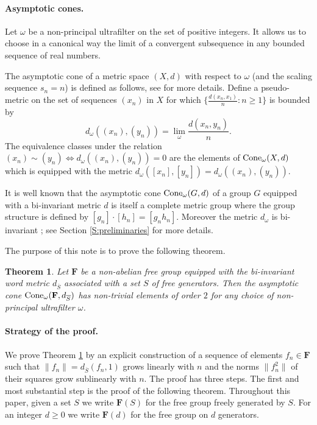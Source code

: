 \documentclass[12pt,reqno,a4paper]{article}
\newtheorem{theorem}{Theorem}[section]
\theoremstyle{definition}
\theoremstyle{remark}
\numberwithin{equation}{section}
\numberwithin{figure}{section}
\newcommand{\B}[1]{{\mathbf #1}}
\begin{document}


\paragraph{Asymptotic cones.}
Let $\omega$ be a non-principal ultrafilter on the set of positive integers.
It allows us to choose in a canonical way the limit of a convergent subsequence in any bounded sequence of real numbers.

The asymptotic cone of a metric space $(X,d)$ with respect to $\omega$ (and the scaling sequence $s_n=n$) is defined as follows, see \cite{zbMATH06866242} for more details.
Define a pseudo-metric on the set of sequences $(x_n)$ in $X$ for which $\{\tfrac{d(x_n,x_1)}{n}: n \geq 1 \}$ is bounded by 
\[
d_\omega((x_n),(y_n)) = \lim_\omega \frac{d(x_n,y_n)}{n}.
\]
The equivalence classes under the relation $(x_n) \sim (y_n) \iff d_\omega((x_n),(y_n))=0$ are the elements of ${\rm Cone}_\omega(X,d)$ which is equipped with the metric $d_\omega([x_n],[y_n])=d_\omega((x_n),(y_n))$.

It is well known that the asymptotic cone ${\rm Cone}_{\omega}(G,d)$ of a group $G$ equipped with a bi-invariant metric $d$ is itself a complete metric group where the group structure is defined by $[g_n] \cdot [h_n] = [g_n h_n]$.
Moreover the metric $d_{\omega}$  is bi-invariant \cite{zbMATH06563655}; see Section \ref{S:preliminaries} for more details.

The purpose of this note is to prove the following theorem.

\begin{theorem}\label{T:main}
Let $\B F$ be a non-abelian free group equipped with the bi-invariant word metric $d_{\overline{S}}$ associated with a set $S$ of free generators.
Then the asymptotic cone ${\rm Cone}_{\omega}(\B F,d_{\overline{S}})$ has non-trivial 
elements of order $2$ for any choice of non-principal ultrafilter $\omega$.
\end{theorem}


\paragraph{Strategy of the proof.}
We prove Theorem \ref{T:main} by an explicit construction of a sequence of
elements $f_n\in \B F$ such that $\|f_n\|=d_{\overline{S}}(f_n,1)$ grows linearly with $n$
and the norms $\|f_n^2\|$ of their squares grow sublinearly with $n$.  The
proof has three steps. 
The first and most substantial step is the proof of the following theorem.
Throughout this paper, given a set $S$  we write $\B F(S)$ for the free group freely generated by $S$. For an integer $d \geq 0$ we write $\B F(d)$ for the free group on $d$ generators.
\end{document}
